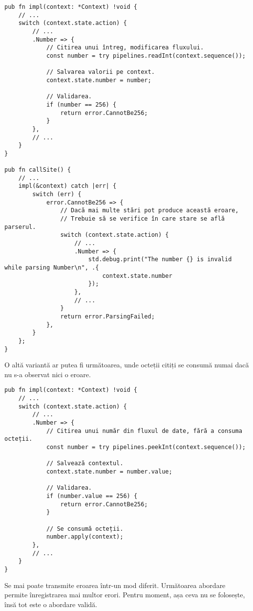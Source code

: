 \documentclass[a4paper,12pt]{report}
\begin{document}
\begin{verbatim}
pub fn impl(context: *Context) !void {
    // ...
    switch (context.state.action) {
        // ...
        .Number => {
            // Citirea unui întreg, modificarea fluxului.
            const number = try pipelines.readInt(context.sequence());

            // Salvarea valorii pe context.
            context.state.number = number;

            // Validarea.
            if (number == 256) {
                return error.CannotBe256;
            }
        },
        // ...
    }
}

pub fn callSite() {
    // ...
    impl(&context) catch |err| {
        switch (err) {
            error.CannotBe256 => {
                // Dacă mai multe stări pot produce această eroare,
                // Trebuie să se verifice în care stare se află parserul.
                switch (context.state.action) {
                    // ...
                    .Number => {
                        std.debug.print("The number {} is invalid while parsing Number\n", .{
                            context.state.number
                        });
                    },
                    // ...
                }
                return error.ParsingFailed;
            },
        }
    };
}
\end{verbatim}

O altă variantă ar putea fi următoarea, unde octeții citiți
se consumă numai dacă nu s-a observat nici o eroare.

\begin{verbatim}
pub fn impl(context: *Context) !void {
    // ...
    switch (context.state.action) {
        // ...
        .Number => {
            // Citirea unui număr din fluxul de date, fără a consuma octeții.
            const number = try pipelines.peekInt(context.sequence());

            // Salvează contextul.
            context.state.number = number.value;

            // Validarea.
            if (number.value == 256) {
                return error.CannotBe256;
            }

            // Se consumă octeții.
            number.apply(context);
        },
        // ...
    }
}
\end{verbatim}

Se mai poate transmite eroarea într-un mod diferit.
Următoarea abordare permite înregistrarea mai multor erori.
Pentru moment, așa ceva nu se folosește, însă tot este o abordare validă.
\end{document}
